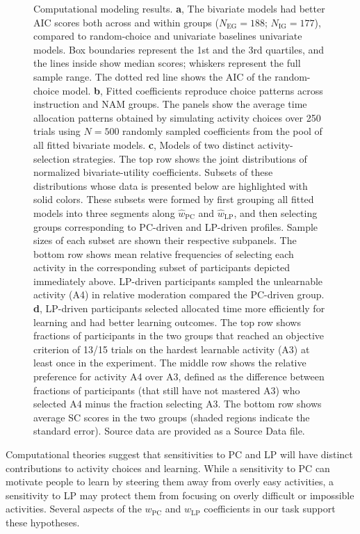 \begin{figure}[tbh!]
    \caption[short description]{Computational modeling results. \textbf{a}, The bivariate models had better AIC scores both across and within groups ($N_\mathrm{EG}=188$; $N_\mathrm{IG}=177$), compared to random-choice and univariate baselines univariate models. Box boundaries represent the 1st and the 3rd quartiles, and the lines inside show median scores; whiskers represent the full sample range. The dotted red line shows the AIC of the random-choice model. \textbf{b}, Fitted coefficients reproduce choice patterns across instruction and \ac{NAM} groups. The panels show the average time allocation patterns obtained by simulating activity choices over 250 trials using $N=500$ randomly sampled coefficients from the pool of all fitted bivariate models. \textbf{c}, Models of two distinct activity-selection strategies. The top row shows the joint distributions of normalized bivariate-utility coefficients. Subsets of these distributions whose data is presented below are highlighted with solid colors. These subsets were formed by first grouping all fitted models into three segments along $\hat w_{\mathrm{PC}}$ and $\hat w_{\mathrm{LP}}$, and then selecting groups corresponding to \ac{PC}-driven and \ac{LP}-driven profiles. Sample sizes of each subset are shown their respective subpanels. The bottom row shows mean relative frequencies of selecting each activity in the corresponding subset of participants depicted immediately above. LP-driven participants sampled the unlearnable activity (A4) in relative moderation compared the \ac{PC}-driven group. \textbf{d}, \ac{LP}-driven participants selected allocated time more efficiently for learning and had better learning outcomes. The top row shows fractions of participants in the two groups that reached an objective criterion of 13/15 trials on the hardest learnable activity (A3) at least once in the experiment. The middle row shows the relative preference for activity A4 over A3, defined as the difference between fractions of participants (that still have not mastered A3) who selected A4 minus the fraction selecting A3. The bottom row shows average \ac{SC} scores in the two groups (shaded regions indicate the standard error). Source data are provided as a Source Data file.}
    \label{fig:CH4_5}
\end{figure}

Computational theories suggest that sensitivities to \ac{PC} and \ac{LP} will have distinct contributions to activity choices and learning. While a sensitivity to \ac{PC} can motivate people to learn by steering them away from overly easy activities, a sensitivity to \ac{LP} may protect them from focusing on overly difficult or impossible activities. Several aspects of the $w_{\mathrm{PC}}$ and $w_{\mathrm{LP}}$ coefficients in our task support these hypotheses.

